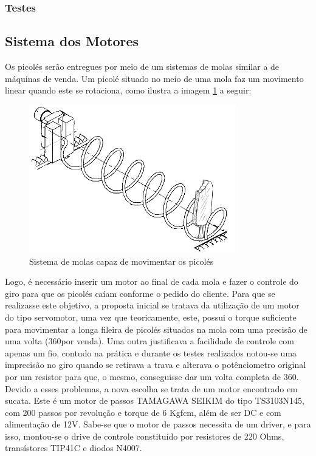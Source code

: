 \subsubsection{Testes}

\subsection{Sistema dos Motores}
Os picolés serão entregues por meio de um sistemas de molas similar a de máquinas de venda. Um picolé situado no meio de uma mola faz um movimento linear quando este se rotaciona, como ilustra a imagem \ref{fig:sistema_molas} a seguir:

\begin{figure}[H]
	\centering
    \includegraphics[width=0.8\textwidth]{figuras/sistema_molas}
    \caption{Sistema de molas capaz de movimentar os picolés}
    \label{fig:sistema_molas}
\end{figure}

Logo, é necessário inserir um motor ao final de cada mola e fazer o controle do giro para que os picolés caíam conforme o pedido do cliente. Para que se realizasse este objetivo, a proposta inicial se tratava da utilização de um motor do tipo servomotor, uma vez que teoricamente, este, possui o torque suficiente para movimentar a longa fileira de picolés situados na mola com uma precisão de uma volta (360\degree por venda). Uma outra justificava a facilidade de controle com apenas um fio, contudo na prática e durante os testes realizados notou-se uma imprecisão no giro quando se retirava a trava e alterava o potênciometro original por um resistor para que, o mesmo, conseguisse dar um volta completa de 360\degree. Devido a esses problemas, a nova escolha se trata de um motor encontrado em sucata. Este é um motor de passos TAMAGAWA SEIKIM do tipo TS3103N145, com 200 passos por revolução e torque de 6 Kgfcm, além de ser DC e com alimentação de 12V.
Sabe-se que o motor de passos necessita de um driver, e para isso, montou-se o drive de controle constituído por resistores de 220 Ohms, transístores TIP41C e diodos N4007.

